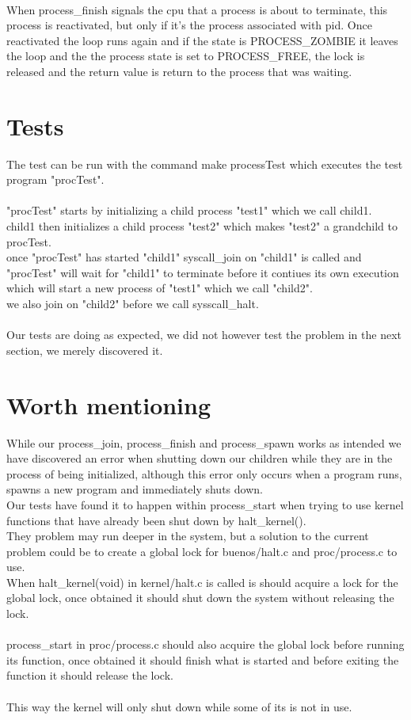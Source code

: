 \documentclass[a4paper,12pt,danish]{report}
\begin{document}
\begin{itemize}
  \\
  When process\_finish signals the cpu that a process is about to terminate, this process is reactivated, but only if it's the process associated with pid. Once reactivated the loop runs again and if the state is PROCESS\_ZOMBIE it leaves the loop and the the process state is set to PROCESS\_FREE, the lock is released and the return value is return to the process that was waiting.
\end{itemize}
\section{Tests}
The test can be run with the command make processTest which executes the test program "procTest".
\\
\\
"procTest" starts by initializing a child process "test1" which we call child1.
\\
child1 then initializes a child process "test2" which makes "test2" a grandchild to procTest.
\\
once "procTest" has started "child1" syscall\_join on "child1" is called and "procTest" will wait for
 "child1" to terminate before it contiues its own execution which will start a new process of "test1" which we
call "child2".
\\
we also join on "child2" before we call sysscall\_halt.
\\
\\
Our tests are doing as expected, we did not however test the problem in the next section, we merely discovered it.
\section{Worth mentioning}
While our process\_join, process\_finish and process\_spawn works as intended we have discovered an error when shutting down our children while they are in the process of being initialized, although this error only occurs when a program runs, spawns a new program and immediately shuts down.
\\
Our tests have found it to happen within process\_start when trying to use kernel functions that have already been shut down by halt\_kernel().
\\
They problem may run deeper in the system, but a solution to the current problem could be to create a global lock for buenos/halt.c and proc/process.c to use.
\\
When halt\_kernel(void) in kernel/halt.c is called is should acquire a lock for the global lock, once obtained it should shut down the system without releasing the lock.
\\
\\
process\_start in proc/process.c should also acquire the global lock before running its function, once obtained it should finish what is started and before exiting the function it should release the lock.
\\
\\
This way the kernel will only shut down while some of its  is not in use.
\end{document}
